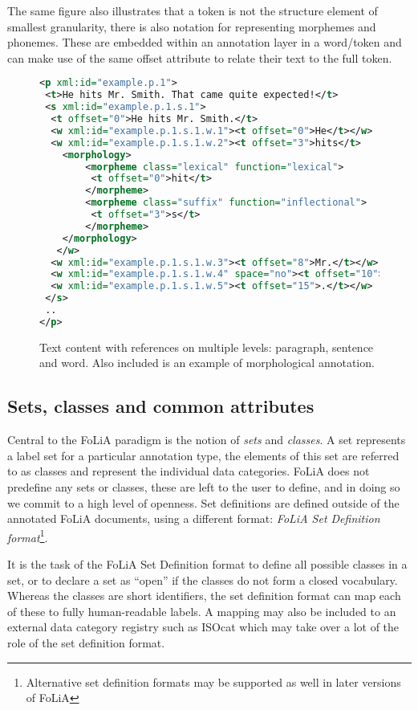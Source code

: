 \documentclass[a4paper,10pt,twoside]{article}
\begin{document}
The same figure also illustrates that a token is not the structure element of
smallest granularity, there is also notation for representing morphemes and
phonemes. These are embedded within an annotation layer in a word/token and
can make use of the same offset attribute to relate their text to the full token.

\begin{figure}[tbh]
\begin{lstlisting}[language=xml]
<p xml:id="example.p.1">
 <t>He hits Mr. Smith. That came quite expected!</t>
 <s xml:id="example.p.1.s.1">
  <t offset="0">He hits Mr. Smith.</t>
  <w xml:id="example.p.1.s.1.w.1"><t offset="0">He</t></w>
  <w xml:id="example.p.1.s.1.w.2"><t offset="3">hits</t>
    <morphology> 
        <morpheme class="lexical" function="lexical">
         <t offset="0">hit</t>
        </morpheme>
        <morpheme class="suffix" function="inflectional">
         <t offset="3">s</t>
        </morpheme>
    </morphology>
   </w>
  <w xml:id="example.p.1.s.1.w.3"><t offset="8">Mr.</t></w>
  <w xml:id="example.p.1.s.1.w.4" space="no"><t offset="10">Smith</t></w>
  <w xml:id="example.p.1.s.1.w.5"><t offset="15">.</t></w>
 </s>
 ..
</p>
\end{lstlisting}
\caption{Text content with references on multiple levels: paragraph, sentence
and word. Also included is an example of morphological annotation.\label{fig:textcontent}}
\end{figure}


\subsection{Sets, classes and common attributes}
\label{sec:setdefinitions} 

Central to the FoLiA paradigm is the notion of \emph{sets} and \emph{classes}.
A set represents a label set for a particular annotation type, the elements of
this set are referred to as classes and represent the individual data
categories. FoLiA does not predefine any sets or classes, these are left to the
user to define, and in doing so we commit to a high level of openness. Set
definitions are defined outside of the annotated FoLiA documents, using a
different format: \emph{FoLiA Set Definition format}\footnote{Alternative set
definition formats may be supported as well in later versions of FoLiA}.

It is the task of the FoLiA Set Definition format to define all possible
classes in a set, or to declare a set as ``open'' if the classes do not form a
closed vocabulary. Whereas the classes are short identifiers, the set
definition format can map each of these to fully human-readable labels. A
mapping may also be included to an external data category registry such as
ISOcat \cite{ISOCAT} which may take over a lot of the role of the set
definition format.
\end{document}
